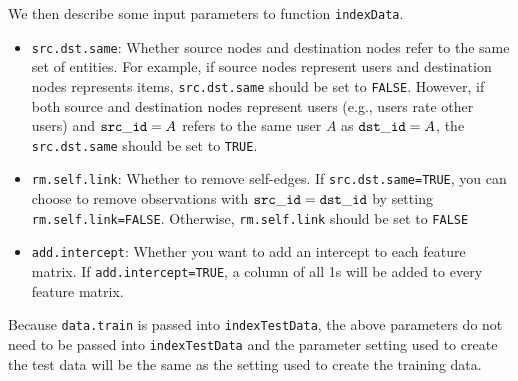 \documentclass[10pt]{article}
\begin{document}
\noindent We then describe some input parameters to function {\tt indexData}.
\begin{itemize}
\item {\tt src.dst.same}: Whether source nodes and destination nodes refer to the same set of entities.  For example, if source nodes represent users and destination nodes represents items, {\tt src.dst.same} should be set to {\tt FALSE}.  However, if both source and destination nodes represent users (e.g., users rate other users) and ${\tt src\_id} = A$ refers to the same user $A$ as ${\tt dst\_id} = A$, the {\tt src.dst.same} should be set to {\tt TRUE}.
\item {\tt rm.self.link}: Whether to remove self-edges.  If {\tt src.dst.same=TRUE}, you can choose to remove observations with ${\tt src\_id} = {\tt dst\_id}$ by setting {\tt rm.self.link=FALSE}.  Otherwise, {\tt rm.self.link} should be set to {\tt FALSE}
\item {\tt add.intercept}: Whether you want to add an intercept to each feature matrix.  If {\tt add.intercept=TRUE}, a column of all 1s will be added to every feature matrix.
\end{itemize}
Because {\tt data.train} is passed into {\tt indexTestData}, the above parameters do not need to be passed into {\tt indexTestData} and the parameter setting used to create the test data will be the same as the setting used to create the training data.
\end{document}
